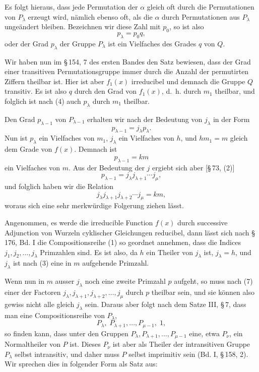 \documentclass[11pt]{article}
\begin{document}
Es folgt hieraus, dass jede Permutation der $\alpha$ gleich oft durch die Permutationen von $P_\lambda$ erzeugt wird, nämlich ebenso oft, als die $\alpha$ durch Permutationen aus $P_\lambda$ ungeändert bleiben. Bezeichnen wir diese Zahl mit $p_0$, so ist also
\begin{equation}
 p_\lambda=p_0q,
 \tag{4}
\end{equation}
oder der Grad $p_\lambda$ der Gruppe $P_\lambda$ ist ein Vielfaches des Grades $q$ von $Q$.

Wir haben nun im \S\,154, 7 des ersten Bandes den Satz bewiesen, dass der Grad einer transitiven Permutationsgruppe immer durch die Anzahl der permutirten Ziffern theilbar ist. Hier ist aber $f_1(x)$ irreducibel und demnach die Gruppe $Q$ transitiv. Es ist also $q$ durch den Grad von $f_1(x)$, d.\ h. durch $m_1$ theilbar, und folglich ist nach (4) auch $p_\lambda$ durch $m_1$ theilbar.

Den Grad $p_{\lambda-1}$ von $P_{\lambda-1}$ erhalten wir nach der Bedeutung von $j_\lambda$ in der Form
\begin{equation}
 p_{\lambda-1}=j_\lambda p_\lambda .
 \tag{5}
\end{equation}
Nun ist $p_\lambda$ ein Vielfaches von $m_1$, $j_\lambda$ ein Vielfaches von $h$, und $hm_1=m$ gleich dem Grade von $f(x)$. Demnach ist
\begin{equation}
 p_{\lambda-1}=k m
 \tag{6}
\end{equation}
ein Vielfaches von $m$. Aus der Bedeutung der $j$ ergiebt sich aber [\S\,73, (2)]
\[
 p_{\lambda-1}=j_\lambda j_{\lambda+1}\cdots j_\mu,
\]
und folglich haben wir die Relation
\begin{equation}
 j_\lambda j_{\lambda+1}j_{\lambda+2}\cdots j_\mu=km,
 \tag{7}
\end{equation}
woraus sich eine sehr merkwürdige Folgerung ziehen lässt.

Angenommen, es werde die irreducible Function $f(x)$ durch successive Adjunction von Wurzeln cyklischer Gleichungen reducibel, dann lässt sich nach \S\,176, Bd. I die Compositionsreihe (1) so geordnet annehmen, dass die Indices $j_1,j_2,\ldots,j_\lambda$ Primzahlen sind. Es ist also, da $h$ ein Theiler von $j_\lambda$ ist, $j_\lambda=h$, und $j_\lambda$ ist nach (3) eine in $m$ aufgehende Primzahl.

Wenn nun in $m$ ausser $j_\lambda$ noch eine zweite Primzahl $p$ aufgeht, so muss nach (7) einer der Factoren $j_\lambda,j_{\lambda+1},j_{\lambda+2},\ldots,j_\mu$ durch $p$ theilbar sein, und sie können also gewiss nicht alle gleich $j_\lambda$ sein. Daraus aber folgt nach dem Satze III, \S\,7, dass man eine Compositionsreihe von $P_\lambda$,
\begin{equation}
 P_\lambda,\;P_{\lambda+1},\ldots,P_{\mu-1},\;1,
 \tag{8}
\end{equation}
so finden kann, dass unter den Gruppen $P_\lambda,P_{\lambda+1},\ldots,P_{\mu-1}$ eine, etwa $P_\nu$, ein Normaltheiler von $P$ ist. Dieses $P_\nu$ ist aber als Theiler der intransitiven Gruppe $P_\lambda$ selbst intransitiv, und daher muss $P$ selbst imprimitiv sein (Bd. I, \S\,158, 2). Wir sprechen dies in folgender Form als Satz aus:
\end{document}
